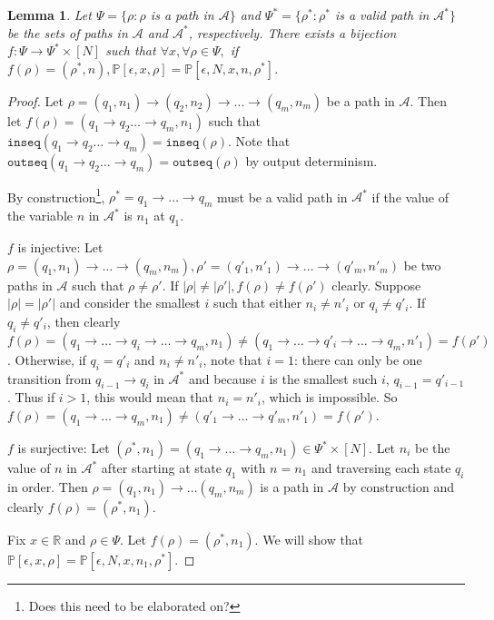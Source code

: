 \documentclass[12pt]{article}
\newcommand{\RR}{\mathbb{R}}
\newcommand{\PP}{\mathbb{P}}
\newtheorem{lemma}[thm]{Lemma}
\theoremstyle{definition}
\begin{document}
\begin{lemma}\label{pathequivalence}
	Let $\Psi = \{\rho: \rho$ is a path in $\mathcal{A}\}$ and $\Psi^* = \{\rho^*: \rho^*$ is a valid path in $\mathcal{A}^*\}$ be the sets of paths in $\mathcal{A}$ and $\mathcal{A}^*$, respectively. There exists a bijection $f: \Psi\to \Psi^*\times [N]$ such that $\forall x, \forall \rho\in \Psi,$ if $f(\rho) = (\rho^*, n), \PP[\epsilon, x, \rho] = \PP[\epsilon, N, x, n, \rho^*]$.
\end{lemma}

\begin{proof}
	Let $\rho = (q_1, n_1)\to(q_2, n_2)\to \ldots \to (q_m, n_m)$ be a path in $\mathcal{A}$. Then let $f(\rho) = (q_1\to q_2\ldots \to q_m, n_1)$ such that $\texttt{inseq}(q_1\to q_2\ldots \to q_m) = \texttt{inseq}(\rho)$. Note that $\texttt{outseq}(q_1\to q_2\ldots \to q_m) = \texttt{outseq}(\rho)$ by output determinism.
	
	By construction\footnote{Does this need to be elaborated on?}, $\rho^* = q_1\to\ldots\to q_m$ must be a valid path in $\mathcal{A}^*$ if the value of the variable $n$ in $\mathcal{A}^*$ is $n_1$ at $q_1$.

	$f$ is injective: Let $\rho = (q_1, n_1)\to \ldots \to (q_m, n_m), \rho' = (q'_1, n'_1)\to \ldots \to (q'_m, n'_m)$ be two paths in $\mathcal{A}$ such that $\rho \neq \rho'$. If $|\rho| \neq |\rho'|, f(\rho) \neq f(\rho')$ clearly. 
	Suppose $|\rho| = |\rho'|$ and consider the smallest $i$ such that either $n_i \neq n'_i$ or $q_i \neq q'_i$. If $q_i \neq q'_i$, then clearly $f(\rho) = (q_1\to\ldots\to q_i\to \ldots \to q_m, n_1)\neq (q_1\to\ldots\to q'_i\to \ldots \to q_m, n'_1) = f(\rho')$. 
	Otherwise, if $q_i = q'_i$ and $n_i \neq n'_i$, note that $i = 1$: there can only be one transition from $q_{i-1}\to q_{i}$ in $\mathcal{A}^*$ and because $i$ is the smallest such $i$, $q_{i-1} = q'_{i-1}$. Thus if $i > 1$, this would mean that $n_i = n'_i$, which is impossible. So $f(\rho) = (q_1\to\ldots\to q_m, n_1) \neq (q'_1\to\ldots\to q'_m, n'_1) = f(\rho')$.

	$f$ is surjective: Let $(\rho^*, n_1) = (q_1\to\ldots \to q_m, n_1) \in \Psi^* \times [N]$. Let $n_i$ be the value of $n$ in $\mathcal{A}^*$ after starting at state $q_1$ with $n=n_1$ and traversing each state $q_i$ in order. Then $\rho = (q_1, n_1)\to \ldots (q_m, n_m)$ is a path in $\mathcal{A}$ by construction and clearly $f(\rho) = (\rho^*, n_1)$.

	Fix $x\in \RR$ and $\rho \in \Psi$. Let $f(\rho) = (\rho^*, n_1)$. We will show that $\PP[\epsilon, x, \rho] = \PP[\epsilon, N, x, n_1, \rho^*]$.


\end{proof}
\end{document}
